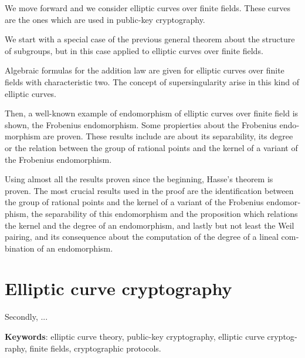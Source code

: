 \begin{otherlanguage}{american}

We move forward and we consider elliptic curves over finite fields. These curves are the ones which are used in public-key cryptography.

We start with a special case of the previous general theorem about the structure of subgroups, but in this case applied to elliptic curves over finite fields.

Algebraic formulas for the addition law are given for elliptic curves over finite fields with characteristic two. The concept of supersingularity arise in this kind of elliptic curves.

Then, a well-known example of endomorphism of elliptic curves over finite field is shown, the Frobenius endomorphism. Some propierties about the Frobenius endomorphism are proven. These results include are about its separability, its degree or the relation between the group of rational points and the kernel of a variant of the Frobenius endomorphism.

Using almost all the results proven since the beginning, Hasse's theorem is proven. The most crucial results used in the proof are the identification between the group of rational points and the kernel of a variant of the Frobenius endomorphism, the separability of this endomorphism and the proposition which relations the kernel and the degree of an endomorphism, and lastly but not least the Weil pairing, and its consequence about the computation of the degree of a lineal combination of an endomorphism.


\section*{Elliptic curve cryptography}

Secondly, ...

\bigskip

\textbf{Keywords}: elliptic curve theory, public-key cryptography, elliptic curve cryptography, finite fields, cryptographic protocols.

\end{otherlanguage}

\endgroup

\vfill
